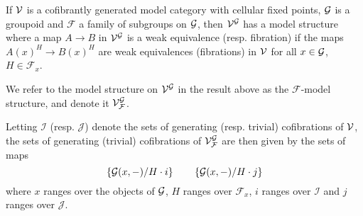 \documentclass[a4paper,10pt
,draft
]{article}%
\renewcommand{\F}{\mathcal F}
\renewcommand{\1}{\eta}%
\begin{document}
\begin{theorem}\label{FMODEL THM}
	If $\mathcal V$ is a cofibrantly generated model category with cellular fixed points, $\mathcal{G}$ is a groupoid and $\F$ a family of subgroups on $\mathcal{G}$,
	then $\mathcal{V}^{\mathcal{G}}$ has a model structure where a map
	$A \to B$ in $\mathcal{V}^{\mathcal{G}}$ is a 
	weak equivalence (resp. fibration) if the maps
	$A(x)^H \to B(x)^H$
	are weak equivalences (fibrations) in $\mathcal V$
	for all $x \in \mathcal{G}$, $H \in \F_x$.
\end{theorem}      

We refer to the model structure on $\mathcal V^{\mathcal{G}}$
in the result above as the $\F$-model structure, 
and denote it $\V^{\G}_{\F}$.


\begin{remark}\label{VGFGEN REM}
	Letting $\mathcal{I}$ (resp. $\mathcal{J}$)
	denote the sets of generating (resp. trivial) cofibrations of 
	$\mathcal V$, the sets of generating (trivial) cofibrations of $\V^{\G}_{\F}$ are then given by the sets of maps
\begin{equation}\label{VGFGEN EQ}
\left\{
	\mathcal{G}(x,-)/H \cdot i\right\} \qquad \left\{\mathcal{G}(x,-)/H \cdot j
\right\}
\end{equation}
where $x$ ranges over the objects of $\mathcal{G}$, $H$ ranges over $\F_x$,
$i$ ranges over $\mathcal{I}$ and 
$j$ ranges over $\mathcal{J}$.
\end{remark}


\end{document}
